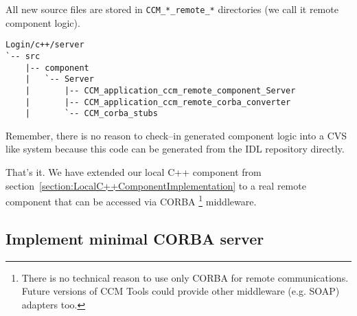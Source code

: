 All new source files are stored in {\tt CCM\_*\_remote\_*} directories (we call
it remote component logic).
\begin{footnotesize}
\begin{verbatim}
Login/c++/server
`-- src
    |-- component
    |   `-- Server
    |       |-- CCM_application_ccm_remote_component_Server
    |       |-- CCM_application_ccm_remote_corba_converter
    |       `-- CCM_corba_stubs
\end{verbatim}
\end{footnotesize}

Remember, there is no reason to check--in generated component logic into a CVS
like system because this code can be generated from the IDL repository directly.

\vspace{3mm}
That's it. We have extended our local C++ component from 
section~\ref{section:LocalC++ComponentImplementation} to a real remote component 
that can be accessed via CORBA
\footnote{
There is no technical reason to use only CORBA for remote communications.
Future versions of CCM Tools could provide other middleware (e.g. SOAP)
adapters too. } 
middleware.

\subsection{Implement minimal CORBA server}
\label{subsection:ImplementMinimalCorbaAserver}

